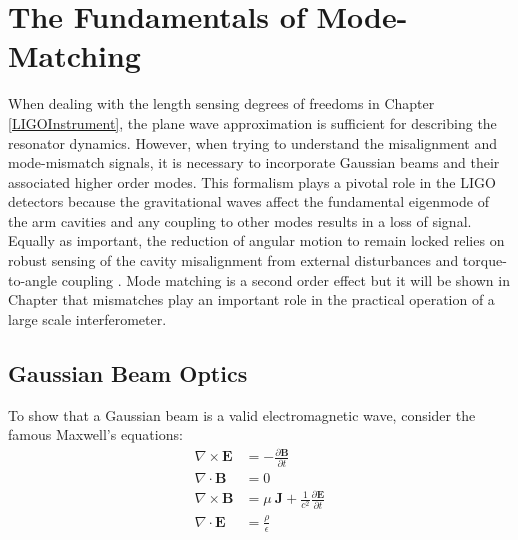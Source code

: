 \chapter{The Fundamentals of Mode-Matching}\label{fund_mm}
		When dealing with the length sensing degrees of freedoms in Chapter \ref{LIGOInstrument}, the plane wave approximation is sufficient for describing the resonator dynamics. However, when trying to understand the misalignment and mode-mismatch signals, it is necessary to incorporate Gaussian beams and their associated higher order modes. This formalism plays a pivotal role in the LIGO detectors because the gravitational waves affect the fundamental eigenmode of the arm cavities and any coupling to other modes results in a loss of signal.  Equally as important, the reduction of angular motion to remain locked relies on robust sensing of the cavity misalignment from external disturbances \cite{Fritschel_alignment} and torque-to-angle coupling \cite{SiggSidle}.  Mode matching is a second order effect but it will be shown in Chapter \label{chapter:MM_LHO} that mismatches play an important role in the practical operation of a large scale interferometer.
		\section{Gaussian Beam Optics}
		To show that a Gaussian beam is a valid electromagnetic wave, consider the famous Maxwell's equations:
		\begin{equation}\label{eq:maxwell}
		\begin{aligned}
		 \nabla \times \mathbf{E} &=-\frac{\partial \mathbf{B}} {\partial t}
		\\\nabla \cdot \mathbf{B} &=0				
		\\\nabla \times \mathbf{B} &= \mu\ \mathbf{J} + \frac{1}{c^2} \frac{\partial \mathbf{E}} {\partial t}
		\\
		\nabla \cdot \mathbf{E} &= \frac{\rho}{\epsilon}
		\end{aligned}
		\end{equation}
		
